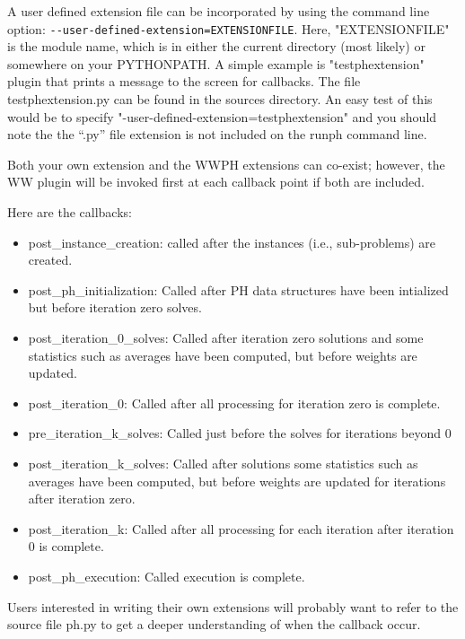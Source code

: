 A user defined extension file can be incorporated by using the command line
option: \verb|--user-defined-extension=EXTENSIONFILE|. Here, "EXTENSIONFILE" is
the module name, which is in either the current directory (most likely) or
somewhere on your PYTHONPATH. A simple example is "testphextension" plugin that
prints a message to the screen for callbacks. The file
testphextension.py can be found in the sources directory. An easy test of this would be to specify
"-user-defined-extension=testphextension" and you should note the the ``.py''
file extension is not included on the runph command line.

Both your own extension and the WWPH extensions can co-exist; however, the WW
plugin will be invoked first at each callback point if both are included.

Here are the callbacks:
\begin{itemize}
  \item post\_instance\_creation: called after the instances (i.e., sub-problems) are created.

  \item post\_ph\_initialization: Called after PH data structures have been
  intialized but before iteration zero solves.

  \item post\_iteration\_0\_solves: Called after iteration zero solutions and
  some statistics such as averages have been computed, but before weights are
  updated.

  \item post\_iteration\_0: Called after all processing for iteration zero is
  complete.

  \item  pre\_iteration\_k\_solves: Called just before the solves for iterations beyond 0

  \item post\_iteration\_k\_solves: Called after solutions some statistics such
  as averages have been computed, but before weights are updated for iterations
  after iteration zero.

  \item post\_iteration\_k: Called after all processing for each iteration after
  iteration 0 is complete.

  \item post\_ph\_execution: Called execution is complete.
\end{itemize}

Users interested in writing their own extensions will probably want to refer to
the source file ph.py to get a deeper understanding of when the callback occur.

